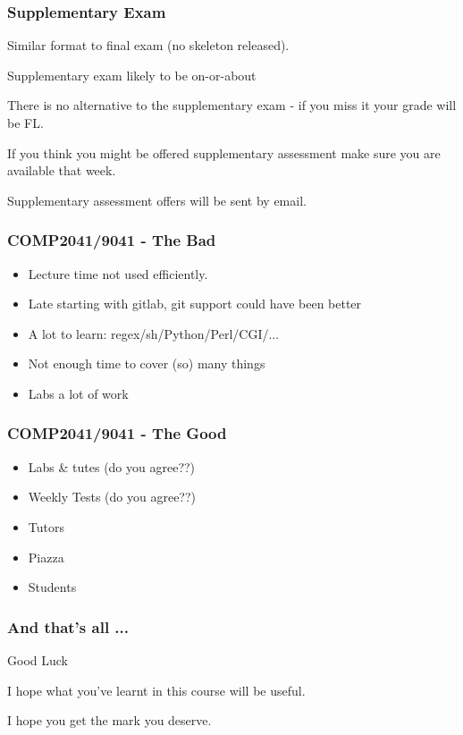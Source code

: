 \begin{frame}
\frametitle{Supplementary Exam}

Similar format to final exam (no skeleton released).
 
Supplementary exam likely to be on-or-about

There is no alternative to the supplementary exam - if you miss it
your grade will be FL.

If you think you might be offered supplementary assessment make sure you are available
that week.

Supplementary assessment offers will be sent by email.
\end{frame}

\begin{frame}
\frametitle{COMP2041/9041 - The Bad}

\begin{itemize}
\item
Lecture time not used efficiently.
\item
Late starting with gitlab, git support could have been better
\item
A lot to learn: regex/sh/Python/Perl/CGI/...
\item
Not enough time to cover (so) many things
\item
Labs a lot of work
\end{itemize}
\end{frame}

\begin{frame}
\frametitle{COMP2041/9041 - The Good}

\begin{itemize}
\item
Labs \& tutes (do you agree??)

\item
Weekly Tests (do you agree??)

\item
Tutors

\item
Piazza 

\item
Students
\end{itemize}
\end{frame}

\begin{frame}
\frametitle{And that's all ...}

Good Luck

I hope what you've learnt in this course will be useful.

I hope you get the mark you deserve.
\end{frame}


